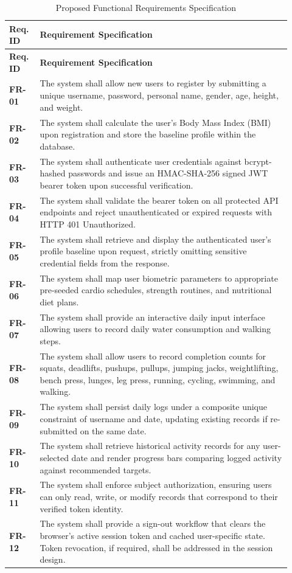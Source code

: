 \documentclass[11pt,a4paper]{report}
\begin{document}
\begin{longtable}{P{0.1\linewidth}P{0.82\linewidth}}
\caption{Proposed Functional Requirements Specification}\label{tab:functional}\\
\toprule
\textbf{Req. ID} & \textbf{Requirement Specification} \\
\midrule
\endfirsthead
\toprule
\textbf{Req. ID} & \textbf{Requirement Specification} \\
\midrule
\endhead
\textbf{FR-01} & The system shall allow new users to register by submitting a unique username, password, personal name, gender, age, height, and weight. \\
\textbf{FR-02} & The system shall calculate the user's Body Mass Index (BMI) upon registration and store the baseline profile within the database. \\
\textbf{FR-03} & The system shall authenticate user credentials against bcrypt-hashed passwords and issue an HMAC-SHA-256 signed JWT bearer token upon successful verification. \\
\textbf{FR-04} & The system shall validate the bearer token on all protected API endpoints and reject unauthenticated or expired requests with HTTP 401 Unauthorized. \\
\textbf{FR-05} & The system shall retrieve and display the authenticated user's profile baseline upon request, strictly omitting sensitive credential fields from the response. \\
\textbf{FR-06} & The system shall map user biometric parameters to appropriate pre-seeded cardio schedules, strength routines, and nutritional diet plans. \\
\textbf{FR-07} & The system shall provide an interactive daily input interface allowing users to record daily water consumption  and walking steps. \\
\textbf{FR-08} & The system shall allow users to record completion counts for squats, deadlifts, pushups, pullups, jumping jacks, weightlifting, bench press, lunges, leg press, running, cycling, swimming, and walking. \\
\textbf{FR-09} & The system shall persist daily logs under a composite unique constraint of username and date, updating existing records if re-submitted on the same date. \\
\textbf{FR-10} & The system shall retrieve historical activity records for any user-selected date and render progress bars comparing logged activity against recommended targets. \\
\textbf{FR-11} & The system shall enforce subject authorization, ensuring users can only read, write, or modify records that correspond to their verified token identity. \\
\textbf{FR-12} & The system shall provide a sign-out workflow that clears the browser's active session token and cached user-specific state. Token revocation, if required, shall be addressed in the session design. \\
\bottomrule
\end{longtable}
\end{document}
